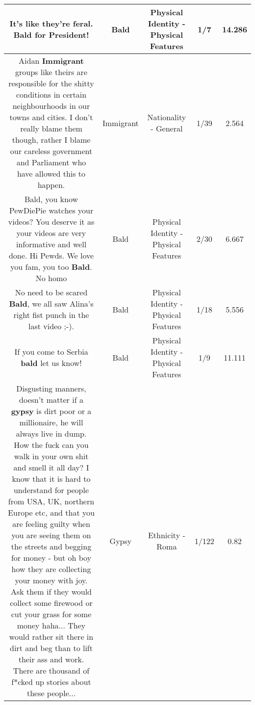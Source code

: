 \documentclass[11pt]{article}
\newlength\mylength
\begin{document}
\begin{center}
\begin{longtable}{|C{.65\mylength}|C{.30\mylength}|C{.12\mylength}|C{.12\mylength}|C{.12\mylength}|}
  \small It's like they're feral. \textbf{Bald} for President!\normalsize   & Bald & Physical Identity - Physical Features & 1/7 & 14.286 \\  \hline
  \small Aidan \textbf{Immigrant} groups like theirs are responsible for the shitty conditions in certain neighbourhoods in our towns and cities. I don't really blame them though, rather I blame our careless government and Parliament who have allowed this to happen.\normalsize   & Immigrant & Nationality - General & 1/39 & 2.564 \\  \hline
  \small Bald, you know PewDiePie watches your videos? You deserve it as your videos are very informative and well done. Hi Pewds. We love you fam, you too \textbf{Bald}. No homo\normalsize   & Bald & Physical Identity - Physical Features & 2/30 & 6.667 \\  \hline
  \small No need to be scared \textbf{Bald}, we all saw Alina's right fist punch in the last video ;-).\normalsize   & Bald & Physical Identity - Physical Features & 1/18 & 5.556 \\  \hline
  \small If you come to Serbia \textbf{bald} let us know!\normalsize   & Bald & Physical Identity - Physical Features & 1/9 & 11.111 \\  \hline
  \small Disgusting manners, doesn't matter if a \textbf{gypsy} is dirt poor or a millionaire, he will always live in dump. How the fuck can you walk in your own shit and smell it all day? I know that it is hard to understand for people from USA, UK, northern Europe etc, and that you are feeling guilty when you are seeing them on the streets and begging for money - but oh boy how they are collecting your money with joy. Ask them if they would collect some firewood or cut your grass for some money haha... They would rather sit there in dirt and beg than to lift their ass and work. There are thousand of f*cked up stories about these people...\normalsize   & Gypsy & Ethnicity - Roma & 1/122 & 0.82 \\  \hline

\end{longtable}
\end{center}
\end{document}
